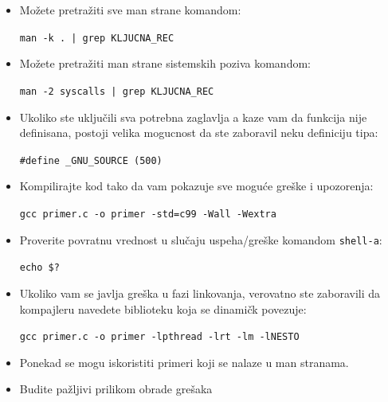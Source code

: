 \documentclass[a4paper, 11pt, twoside]{article}
\begin{document}
\begin{itemize}
	\item{Možete pretražiti sve man strane komandom: \\ \vspace{-3mm} \begin{center}\texttt{man -k . | grep KLJUCNA\_REC}\end{center}}
			\vspace{1mm} 
	\item{Možete pretražiti man strane sistemskih poziva komandom: \\ \vspace{-3mm} \begin{center}\texttt{man -2 syscalls | grep KLJUCNA\_REC}\end{center}}
			\vspace{1mm} 
		\item{Ukoliko ste uključili sva potrebna zaglavlja a kaze vam da funkcija nije definisana, postoji velika mogucnost da ste zaboravil neku definiciju tipa: \\ \vspace{-3mm} \begin{center}\texttt{\#define \_GNU\_SOURCE (500)}\end{center}}
			\vspace{1mm} 
	\item{Kompilirajte kod tako da vam pokazuje sve moguće greške i upozorenja: \\ \vspace{-3mm} \begin{center}\texttt{gcc primer.c -o primer -std=c99 -Wall -Wextra}\end{center}}
			\vspace{1mm} 
	\item{Proverite povratnu vrednost u slučaju uspeha/greške komandom \texttt{shell-a}: \\ \vspace{-3mm} \begin{center}\texttt{echo \$?}\end{center}}
			\vspace{1mm} 
	\item{Ukoliko vam se javlja greška u fazi linkovanja, verovatno ste zaboravili da kompajleru navedete biblioteku koja se dinamičk povezuje: \\ \vspace{-3mm} \begin{center}\texttt{gcc primer.c -o primer -lpthread -lrt -lm -lNESTO}\end{center}}
			\vspace{1mm} 
		\item{Ponekad se mogu iskoristiti primeri koji se nalaze u man stranama.}
			\vspace{1mm} 
			\item{Budite pažljivi prilikom obrade grešaka}
\end{itemize}
\end{document}
